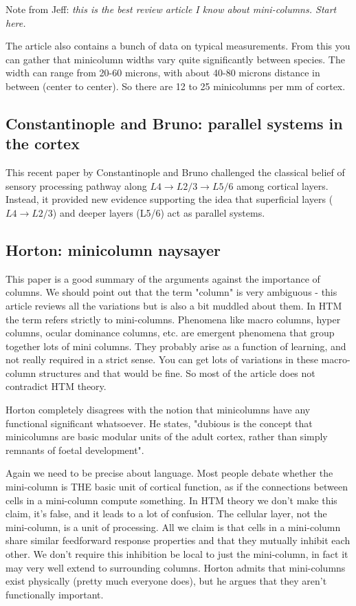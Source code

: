 \documentclass{article} %
\begin{document}
\cite{Buxhoeveden2002} Note from Jeff: \emph{this is the best review article I
know about mini-columns. Start here.}

The article also contains a bunch of data on typical measurements. From this you
can gather that minicolumn widths vary quite significantly between species.  The
width can range from 20-60 microns, with about 40-80 microns distance in between
(center to center).  So there are 12 to 25 minicolumns per mm of cortex.

\subsection{Constantinople and Bruno: parallel systems in the cortex}
This recent paper by Constantinople and Bruno \cite{Constantinople2013}
challenged the  classical belief of sensory processing pathway along
$L4\rightarrow L2/3 \rightarrow L5/6$ among cortical layers.  Instead, it
provided new evidence supporting the idea that superficial layers
($L4\rightarrow L2/3$) and  deeper layers (L5/6) act as parallel systems.

\subsection{Horton: minicolumn naysayer}

This paper \cite{Horton2005} is a good summary of the arguments against the
importance of columns. We should point out that the term "column" is very
ambiguous - this article reviews all the variations but is also a bit muddled
about them. In HTM the term  refers strictly to mini-columns. Phenomena like
macro columns, hyper columns, ocular dominance columns, etc. are emergent
phenomena that group together lots of mini columns. They probably arise as a
function of learning, and not really required in a strict sense. You can get
lots of variations in these macro-column structures and that would be fine. So
most of the article does not contradict HTM theory.

Horton completely disagrees  with the notion  that minicolumns have
any functional significant whatsoever.  He states, "dubious is the concept that
minicolumns are basic modular units of the adult cortex, rather than simply
remnants of foetal development".

Again we need to be precise about language. Most people debate whether the
mini-column is THE  basic unit of cortical function, as if the connections
between cells in a mini-column compute something.  In HTM theory we don’t make
this claim, it’s false, and it leads to a lot of confusion.  The cellular layer,
not the mini-column, is a unit of processing. All we claim is that cells in a
mini-column share similar feedforward response properties and that they mutually
inhibit each other.  We don’t require this inhibition be local to just the
mini-column, in fact it may very well extend to surrounding columns.  Horton
admits that mini-columns exist physically (pretty much everyone does), but he
argues that they aren’t functionally important.
\end{document}

